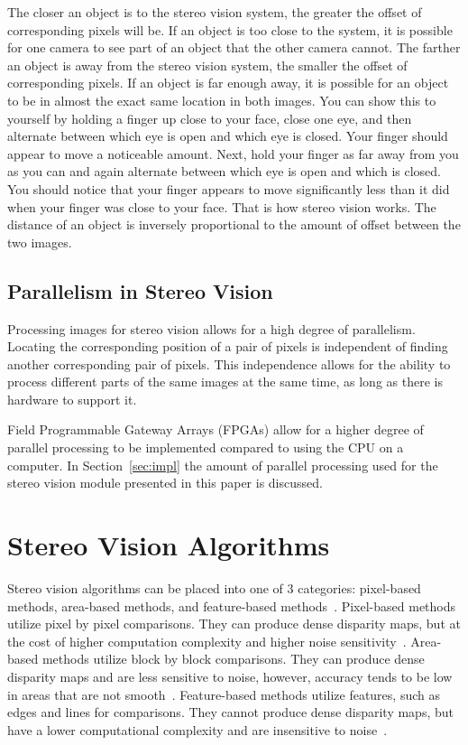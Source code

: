 The closer an object is to the stereo vision system, the greater the offset of corresponding pixels will be. If an object is too close to the system, it is possible for one camera to see part of an object that the other camera cannot. The farther an object is away from the stereo vision system, the smaller the offset of corresponding pixels. If an object is far enough away, it is possible for an object to be in almost the exact same location in both images. You can show this to yourself by holding a finger up close to your face, close one eye, and then alternate between which eye is open and which eye is closed. Your finger should appear to move a noticeable amount. Next, hold your finger as far away from you as you can and again alternate between which eye is open and which is closed. You should notice that your finger appears to move significantly less than it did when your finger was close to your face. That is how stereo vision works. The distance of an object is inversely proportional to the amount of offset between the two images.

\subsection{Parallelism in Stereo Vision}

Processing images for stereo vision allows for a high degree of parallelism. Locating the corresponding position of a pair of pixels is independent of finding another corresponding pair of pixels. This independence allows for the ability to process different parts of the same images at the same time, as long as there is hardware to support it.

Field Programmable Gateway Arrays (FPGAs) allow for a higher degree of parallel processing to be implemented compared to using the CPU on a computer. In Section~\ref{sec:impl} the amount of parallel processing used for the stereo vision module presented in this paper is discussed. 

\section{Stereo Vision Algorithms}

Stereo vision algorithms can be placed into one of 3 categories: pixel-based methods, area-based methods, and feature-based methods~\cite{xilinxSpartan3ABoard}. Pixel-based methods utilize pixel by pixel comparisons. They can produce dense disparity maps, but at the cost of higher computation complexity and higher noise sensitivity~\cite{xilinxSpartan3ABoard}. Area-based methods utilize block by block comparisons. They can produce dense disparity maps and are less sensitive to noise, however, accuracy tends to be low in areas that are not smooth~\cite{xilinxSpartan3ABoard}. Feature-based methods utilize features, such as edges and lines for comparisons. They cannot produce dense disparity maps, but have a lower computational complexity and are insensitive to noise~\cite{xilinxSpartan3ABoard}. 

